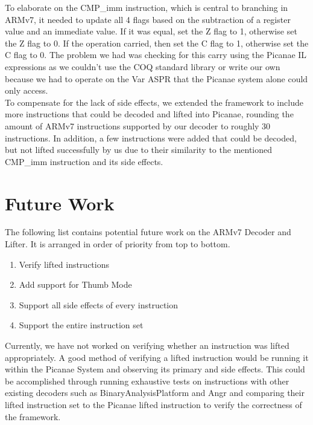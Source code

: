 \documentclass[twocolumn]{article}
\begin{document}
To elaborate on the CMP\_imm instruction, which is central to branching in ARMv7, it needed to update all 4 flags based on the subtraction of a register value and an immediate value. If it was equal, set the Z flag to 1, otherwise set the Z flag to 0. If the operation carried, then set the C flag to 1, otherwise set the C flag to 0. The problem we had was checking for this carry using the Picanae IL expressions as we couldn't use the COQ standard library or write our own because we had to operate on the Var ASPR that the Picanae system alone could only access.\\

To compensate for the lack of side effects, we extended the framework to include more instructions that could be decoded and lifted into Picanae, rounding the amount of ARMv7 instructions supported by our decoder to roughly 30 instructions. In addition, a few instructions were added that could be decoded, but not lifted successfully by us due to their similarity to the mentioned CMP\_imm instruction and its side effects.


\section*{\centering Future Work}
\vspace{0.3cm}

The following list contains potential future work on the ARMv7 Decoder and Lifter. It is arranged in order of priority from top to bottom.\\
\begin{enumerate}
	\item Verify lifted instructions
	\item Add support for Thumb Mode
	\item Support all side effects of every instruction
	\item Support the entire instruction set\\
\end{enumerate}

Currently, we have not worked on verifying whether an instruction was lifted appropriately. A good method of verifying a lifted instruction would be running it within the Picanae System and observing its primary and side effects. This could be accomplished through running exhaustive tests on instructions with other existing decoders such as BinaryAnalysisPlatform and Angr and comparing their lifted instruction set to the Picanae lifted instruction to verify the correctness of the framework.\\
\end{document}
